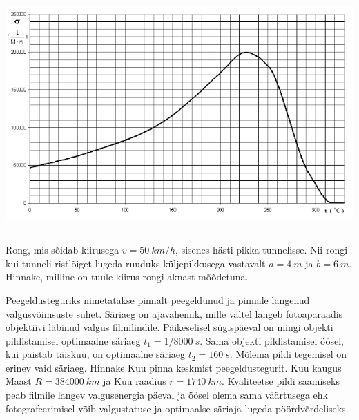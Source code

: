 \documentclass[10pt, twoside]{article}
\begin{document}
{\begin{center}
	\includegraphics[width=\linewidth]{2008-lahg-10-yl}
\end{center}
\probend
\bigskip
\newpage\subsection{\protect{}}


Rong, mis sõidab kiirusega $v = \SI{50}{km/h}$, sisenes hästi pikka tunnelisse. Nii rongi kui tunneli ristlõiget lugeda ruuduks küljepikkusega vastavalt $a = \SI{4}{m}$ ja $b = \SI{6}{m}$. Hinnake, milline on tuule kiirus rongi aknast mõõdetuna.
\probend
\bigskip


Peegeldusteguriks nimetatakse pinnalt peegeldunud ja pinnale langenud valgusvõimsuste suhet. Säriaeg on ajavahemik, mille vältel langeb fotoaparaadis objektiivi läbinud valgus filmilindile. Päikeselisel sügispäeval on mingi objekti pildistamisel optimaalne säriaeg $t_1 = 1/\SI{8000}{s}$. Sama objekti pildistamisel öösel, kui paistab täiskuu, on optimaalne säriaeg $t_2 = \SI{160}{s}$. Mõlema pildi tegemisel on erinev vaid säriaeg. Hinnake Kuu pinna keskmist peegeldustegurit. Kuu kaugus Maast $R = \SI{384000}{km}$ ja Kuu raadius $r = \SI{1740}{km}$. Kvaliteetse pildi saamiseks peab filmile langev valgusenergia päeval ja öösel olema sama väärtusega ehk fotografeerimisel võib valgustatuse ja optimaalse säriaja lugeda pöördvõrdeliseks.
\probend
\bigskip

}
\end{document}
